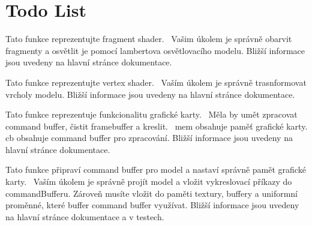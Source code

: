\chapter{Todo List}
\hypertarget{todo}{}\label{todo}

\begin{DoxyRefList}
\item[Member \doxylink{prepareModel_8hpp_a8fd935a09a7659cb2858aca6d22d827c}{student\+\_\+draw\+Model\+\_\+fragment\+Shader} (\doxylink{structOutFragment}{Out\+Fragment} \&out\+Fragment, \doxylink{structInFragment}{In\+Fragment} const \&in\+Fragment, \doxylink{structShaderInterface}{Shader\+Interface} const \&si)]\label{todo__todo000004}%
%
Tato funkce reprezentujte fragment shader.~\newline
 Vašim úkolem je správně obarvit fragmenty a osvětlit je pomocí lambertova osvětlovacího modelu. Bližší informace jsou uvedeny na hlavní stránce dokumentace.  
\item[Member \doxylink{prepareModel_8hpp_a034552bbcfbd934b738aacf12ea64839}{student\+\_\+draw\+Model\+\_\+vertex\+Shader} (\doxylink{structOutVertex}{Out\+Vertex} \&out\+Vertex, \doxylink{structInVertex}{In\+Vertex} const \&in\+Vertex, \doxylink{structShaderInterface}{Shader\+Interface} const \&si)]\label{todo__todo000003}%
%
Tato funkce reprezentujte vertex shader.~\newline
 Vaším úkolem je správně trasnformovat vrcholy modelu. Bližší informace jsou uvedeny na hlavní stránce dokumentace.  
\item[Member \doxylink{studentSolution_2src_2studentSolution_2gpu_8hpp_acb235bf1bd34504bf58828aac4d40b11}{student\+\_\+\+GPU\+\_\+run} (\doxylink{structGPUMemory}{GPUMemory} \&mem, \doxylink{structCommandBuffer}{Command\+Buffer} const \&cb)]\label{todo__todo000001}%
%
Tato funkce reprezentuje funkcionalitu grafické karty.~\newline
 Měla by umět zpracovat command buffer, čistit framebuffer a kreslit.~\newline
 mem obsahuje paměť grafické karty. cb obsahuje command buffer pro zpracování. Bližší informace jsou uvedeny na hlavní stránce dokumentace. 
\item[Member \doxylink{prepareModel_8hpp_a46fe75e58d09064a5a33d511123d3a4d}{student\+\_\+prepare\+Model} (\doxylink{structGPUMemory}{GPUMemory} \&mem, \doxylink{structCommandBuffer}{Command\+Buffer} \&command\+Buffer, \doxylink{structModel}{Model} const \&model)]\label{todo__todo000002}%
%
Tato funkce připraví command buffer pro model a nastaví správně pamět grafické karty.~\newline
 Vaším úkolem je správně projít model a vložit vykreslovací příkazy do command\+Bufferu. Zároveň musíte vložit do paměti textury, buffery a uniformní proměnné, které buffer command buffer využívat. Bližší informace jsou uvedeny na hlavní stránce dokumentace a v testech. 
\end{DoxyRefList}